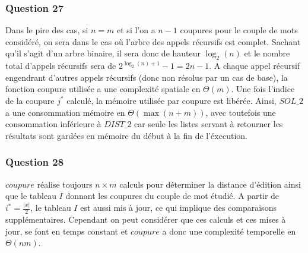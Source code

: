 \documentclass[12pt, a4paper]{report}
\begin{document}
\subsubsection{Question 27}
Dans le pire des cas, si $n=m$ et si l'on a $n-1$ coupures pour le couple de mots considéré, on sera dans le cas où l'arbre des appels récursifs est complet. Sachant qu'il s'agit d'un arbre binaire, il sera donc de hauteur $\log_{2}{(n)}$ et le nombre total d'appels récursifs sera de $2^{\log_{2}{(n)}+1}-1=2n-1$.
A chaque appel récursif engendrant d'autres appels récursifs (donc non résolus par un cas de base), la fonction coupure utilisée a une complexité spatiale en $\Theta(m)$. Une fois l'indice de la coupure $j^{*}$ calculé, la mémoire utilisée par coupure est libérée. Ainsi, $SOL\_2$ a une consommation mémoire en $\Theta(\max(n+m))$, avec toutefois une consommation inférieure à $DIST\_2$ car seule les listes servant à retourner les résultats sont gardées en mémoire du début à la fin de l'éxecution.


\subsubsection{Question 28}

$coupure$ réalise toujours $n\times m$ calculs pour déterminer la distance d'édition ainsi que le tableau $I$ donnant les coupures du couple de mot étudié. A partir de  $i^{*}=\frac{|x|}{2}$, le tableau $I$ est aussi mis à jour, ce qui implique des comparaisons supplémentaires. Cependant on peut considérer que ces calculs et ces mises à jour, se font en temps constant et $coupure$ a donc une complexité temporelle en $\Theta(nm)$.
\end{document}

